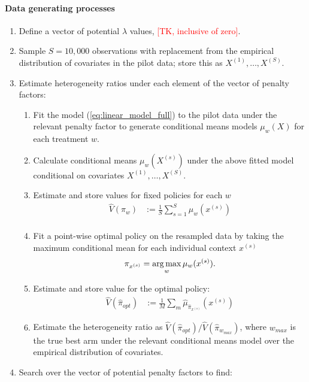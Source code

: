 \documentclass[letterpaper, 12pt, parskip=full,]{scrartcl}
\begin{document}
\paragraph{Data generating processes}
\begin{enumerate}
\item Define a vector of potential $\lambda$ values, \textcolor{red}{[TK, inclusive of zero]}. 
\item  Sample $S=10,000$ observations with replacement from the empirical distribution of covariates in the pilot data; store this as $X^{(1)}, \dots,X^{(S)}$. 
\item Estimate heterogeneity ratios under each element of the vector of penalty factors:
\begin{enumerate}
\item Fit the model (\ref{eq:linear_model_full}) to the pilot data under the relevant penalty factor to generate conditional means models $\mu_{w}(X)$ for each treatment $w$.
  \item Calculate conditional means $\mu_{w}(X^{(s)})$ under the above fitted model conditional on covariates $X^{(1)}, \dots,X^{(S)}$. 
  \item Estimate and store values for fixed policies for each $w$
      \begin{align}
          \hat{V}({\pi}_{w})  &:= \frac{1}{S} \sum_{s = 1}^S \mu_{w}(x^{(s)}) \\
          \end{align}
  \item Fit a point-wise optimal policy on the resampled data by taking the maximum conditional mean for each individual context $x^{(s)}$ 
    \begin{equation}
     \pi_{x^{(s)}} = \operatorname*{arg\,max}_{ w } \mu_{w}(x^{(s)}) . 
    \end{equation} 
    \item Estimate and store value for the optimal policy:
    \begin{align}
      \hat{V}(\hat{\pi}_{opt})  &:= \frac{1}{M} \sum_m \hat{\mu}_{\hat{\pi}_{x^{(s)}}}(x^{(s)}) 
          \end{align}
  \item Estimate the heterogeneity ratio as $\hat{V}(\hat{\pi}_{opt})/\hat{V}(\hat{\pi}_{w_{max}})$, where $w_{max}$ is the true best arm under the relevant conditional means model over the empirical distribution of covariates. 
\end{enumerate}
\item Search over the vector of potential penalty factors to find:

\end{enumerate}
\end{document}
